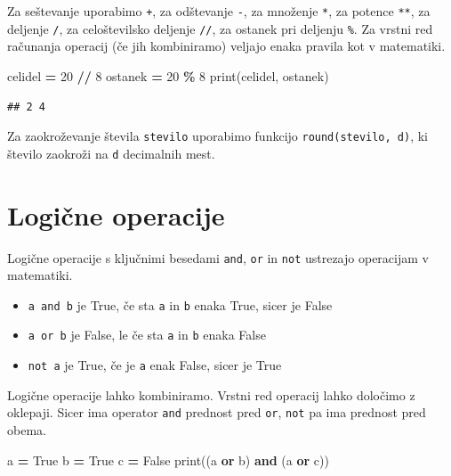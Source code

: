 \documentclass[
]{book}
\newenvironment{Shaded}{\begin{snugshade}}{\end{snugshade}}
\newcommand{\BuiltInTok}[1]{#1}
\newcommand{\DecValTok}[1]{\textcolor[rgb]{0.00,0.00,0.81}{#1}}
\newcommand{\KeywordTok}[1]{\textcolor[rgb]{0.13,0.29,0.53}{\textbf{#1}}}
\newcommand{\NormalTok}[1]{#1}
\newcommand{\OperatorTok}[1]{\textcolor[rgb]{0.81,0.36,0.00}{\textbf{#1}}}
\newcommand{\VariableTok}[1]{\textcolor[rgb]{0.00,0.00,0.00}{#1}}
\providecommand{\tightlist}{%
  \setlength{\itemsep}{0pt}\setlength{\parskip}{0pt}}
\begin{document}
Za seštevanje uporabimo \texttt{+}, za odštevanje \texttt{-}, za množenje \texttt{*}, za potence \texttt{**},
za deljenje \texttt{/}, za celoštevilsko deljenje \texttt{//}, za ostanek pri deljenju \texttt{\%}.
Za vrstni red računanja operacij (če jih kombiniramo) veljajo enaka pravila kot
v matematiki.

\begin{Shaded}
\begin{Highlighting}[]
\NormalTok{celidel }\OperatorTok{=} \DecValTok{20} \OperatorTok{//} \DecValTok{8}
\NormalTok{ostanek }\OperatorTok{=} \DecValTok{20} \OperatorTok{\%} \DecValTok{8}
\BuiltInTok{print}\NormalTok{(celidel, ostanek)}
\end{Highlighting}
\end{Shaded}

\begin{verbatim}
## 2 4
\end{verbatim}

Za zaokroževanje števila \texttt{stevilo} uporabimo funkcijo \texttt{round(stevilo,\ d)}, ki število zaokroži na \texttt{d} decimalnih mest.

\hypertarget{logiux10dne-operacije}{%
\section{Logične operacije}\label{logiux10dne-operacije}}

Logične operacije s ključnimi besedami \texttt{and}, \texttt{or} in \texttt{not} ustrezajo operacijam v matematiki.

\begin{itemize}
\tightlist
\item
  \texttt{a\ and\ b} je True, če sta \texttt{a} in \texttt{b} enaka True, sicer je False
\item
  \texttt{a\ or\ b} je False, le če sta \texttt{a} in \texttt{b} enaka False
\item
  \texttt{not\ a} je True, če je \texttt{a} enak False, sicer je True
\end{itemize}

Logične operacije lahko kombiniramo. Vrstni red operacij lahko določimo z oklepaji.
Sicer ima operator \texttt{and} prednost pred \texttt{or}, \texttt{not} pa ima prednost pred obema.

\begin{Shaded}
\begin{Highlighting}[]
\NormalTok{a }\OperatorTok{=} \VariableTok{True}
\NormalTok{b }\OperatorTok{=} \VariableTok{True}
\NormalTok{c }\OperatorTok{=} \VariableTok{False}
\BuiltInTok{print}\NormalTok{((a }\KeywordTok{or}\NormalTok{ b) }\KeywordTok{and}\NormalTok{ (a }\KeywordTok{or}\NormalTok{ c))}
\end{Highlighting}
\end{Shaded}
\end{document}
